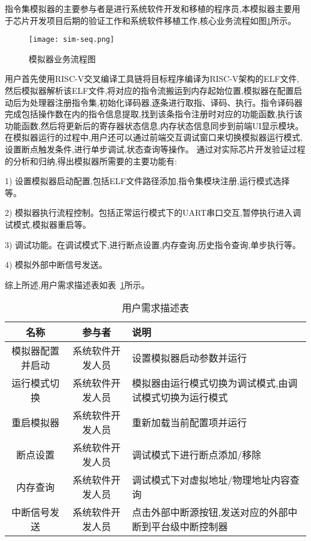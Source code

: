 指令集模拟器的主要参与者是进行系统软件开发和移植的程序员,本模拟器主要用于芯片开发项目后期的验证工作和系统软件移植工作,核心业务流程如图\ref{fig:sim-seq}所示。
\begin{figure}[H]
  \centering
  \texttt{[image: sim-seq.png]}
  \caption{模拟器业务流程图}
  \label{fig:sim-seq}
\end{figure}

用户首先使用RISC-V交叉编译工具链将目标程序编译为RISC-V架构的ELF文件,然后模拟器解析该ELF文件,将对应的指令流搬运到内存起始位置,模拟器在配置启动后为处理器注册指令集,初始化译码器,逐条进行取指、译码、执行。指令译码器完成包括操作数在内的指令信息提取,找到该条指令注册时对应的功能函数,执行该功能函数,然后将更新后的寄存器状态信息,内存状态信息同步到前端UI显示模块。在模拟器运行的过程中,用户还可以通过前端交互调试窗口来切换模拟器运行模式,设置断点触发条件,进行单步调试,状态查询等操作。
通过对实际芯片开发验证过程的分析和归纳,得出模拟器所需要的主要功能有:


1) 设置模拟器启动配置,包括ELF文件路径添加,指令集模块注册,运行模式选择等。


2) 模拟器执行流程控制。包括正常运行模式下的UART串口交互,暂停执行进入调试模式,模拟器重启等。


3) 调试功能。在调试模式下,进行断点设置,内存查询,历史指令查询,单步执行等。


4) 模拟外部中断信号发送。


综上所述,用户需求描述表如表~\ref{tab:tab1}所示。
\begin{table}[H]
  \centering
  \caption{用户需求描述表}
  \label{tab:tab1}
  \renewcommand\arraystretch{1.2}
  \begin{tabular}{ccl}
    \toprule
    名称   & 参与者   & 说明   \\
    \midrule
    模拟器配置并启动 & 系统软件开发人员 & \multicolumn{1}{p{6cm}}{设置模拟器启动参数并运行} \\ \hline
    运行模式切换 &	系统软件开发人员	& \multicolumn{1}{m{6cm}}{模拟器由运行模式切换为调试模式,由调试模式切换为运行模式}\\
    \hline
    重启模拟器	& 系统软件开发人员	& \multicolumn{1}{p{6cm}}{重新加载当前配置项并运行}\\
    \hline
    断点设置 &	系统软件开发人员 &	\multicolumn{1}{p{6cm}}{调试模式下进行断点添加/移除}\\
    \hline
    内存查询 &	系统软件开发人员 &	\multicolumn{1}{m{6cm}}{调试模式下对虚拟地址/物理地址内容查询}\\
    \hline
    中断信号发送	& 系统软件开发人员 &	\multicolumn{1}{m{6cm}}{点击外部中断源按钮,发送对应的外部中断到平台级中断控制器}\\
    \bottomrule
  \end{tabular}
\end{table}


